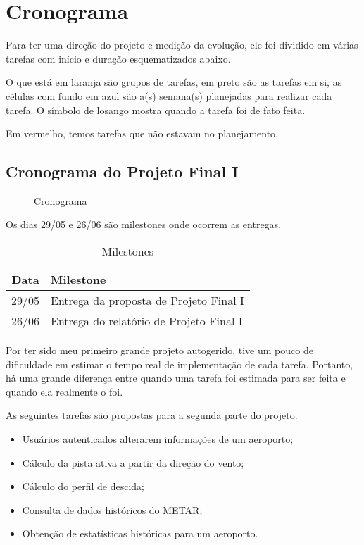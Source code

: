 \chapter{Cronograma}

Para ter uma direção do projeto e medição da evolução, ele foi dividido 
em várias tarefas com início e duração esquematizados abaixo.

O que está em laranja são grupos de tarefas, em preto são as tarefas em si, as células com fundo 
em azul são a(s) semana(s) planejadas para realizar cada tarefa. O símbolo de losango mostra 
quando a tarefa foi de fato feita.

Em vermelho, temos tarefas que não estavam no planejamento.

\section{Cronograma do Projeto Final I}

\begin{figure}[ht]
    \begin{center}
    
    \caption{Cronograma}
    \label{fig:cronograma-planejado}
    \end{center}
\end{figure}

Os dias 29/05 e 26/06 são milestones onde ocorrem as entregas.

\begin{table}[h]
    \centering
    \caption{Milestones}
    \begin{tabular}{|c|l|}
        \hline
        \textbf{Data} & \textbf{Milestone} \\
        \hline
        29/05 & Entrega da proposta de Projeto Final I \\
        26/06 & Entrega do relatório de Projeto Final I \\
        \hline
    \end{tabular}
\end{table}

Por ter sido meu primeiro grande projeto autogerido, tive um pouco de dificuldade em estimar o tempo real 
de implementação de cada tarefa. Portanto, há uma grande diferença entre quando uma tarefa foi estimada 
para ser feita e quando ela realmente o foi.

As seguintes tarefas são propostas para a segunda parte do projeto.

\begin{itemize}
    \item Usuários autenticados alterarem informações de um aeroporto;
    \item Cálculo da pista ativa a partir da direção do vento;
    \item Cálculo do perfil de descida;
    \item Consulta de dados históricos do METAR;
    \item Obtenção de estatísticas históricas para um aeroporto.
\end{itemize}

